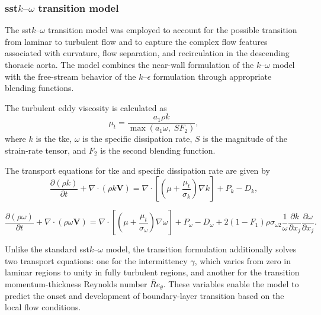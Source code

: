 \documentclass[12pt,a4paper]{article}
\newcommand{\TKE}{\ac{tke}\xspace}
\newcommand{\SST}{\ac{sst}\xspace}
\newcommand{\SSTcap}{\Ac{sst}\xspace}
\theoremstyle{definition}
\numberwithin{equation}{section}
\begin{document}
\subsubsection{\texorpdfstring{\SSTcap \(k\)--\(\omega\) transition model}{SST k-omega transition model}}

The \SST \(k\)--\(\omega\) transition model was employed to account for the possible transition from laminar to turbulent flow and to capture the complex flow features associated with curvature, flow separation, and recirculation in the descending thoracic aorta. The model combines the near-wall formulation of the \(k\)--\(\omega\) model with the free-stream behavior of the \(k\)--\(\epsilon\) formulation through appropriate blending functions.

The turbulent eddy viscosity is calculated as
\begin{equation}
    \mu_t =
    \frac{a_1 \rho k}
    {\max(a_1\omega,\;SF_2)},
    \label{eq:mutt}
\end{equation}
where \(k\) is the \TKE, \(\omega\) is the specific dissipation rate, \(S\) is the magnitude of the strain-rate tensor, and \(F_2\) is the second blending function.

The transport equations for \TKE and specific dissipation rate are given by
\begin{equation}
\frac{\partial(\rho k)}{\partial t}
+\nabla\cdot(\rho k\mathbf{V})
=
\nabla\cdot
\left[
\left(\mu+\frac{\mu_t}{\sigma_k}\right)\nabla k
\right]
+P_k-D_k,
\label{eq:keqn}
\end{equation}

\begin{equation}
\frac{\partial(\rho\omega)}{\partial t}
+\nabla\cdot(\rho\omega\mathbf{V})
=
\nabla\cdot
\left[
\left(\mu+\frac{\mu_t}{\sigma_\omega}\right)\nabla\omega
\right]
+P_\omega-D_\omega
+
2(1-F_1)\rho\sigma_{\omega2}
\frac{1}{\omega}
\frac{\partial k}{\partial x_j}
\frac{\partial\omega}{\partial x_j}.
\label{eq:omegaeqn}
\end{equation}

Unlike the standard \SST \(k\)--\(\omega\) model, the transition formulation additionally solves two transport equations: one for the intermittency \(\gamma\), which varies from zero in laminar regions to unity in fully turbulent regions, and another for the transition momentum-thickness Reynolds number \(\widetilde{Re}_\theta\). These variables enable the model to predict the onset and development of boundary-layer transition based on the local flow conditions.
\end{document}
